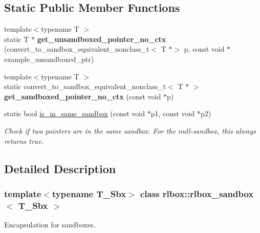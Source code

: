 \subsection*{Static Public Member Functions}
\begin{DoxyCompactItemize}
\item 
\mbox{\label{classrlbox_1_1rlbox__sandbox_a2fbafbb1cb567e11a869b0080e431d06}} 
{\footnotesize template$<$typename T $>$ }\\static T $\ast$ {\bfseries get\+\_\+unsandboxed\+\_\+pointer\+\_\+no\+\_\+ctx} (convert\+\_\+to\+\_\+sandbox\+\_\+equivalent\+\_\+nonclass\+\_\+t$<$ T $\ast$$>$ p, const void $\ast$example\+\_\+unsandboxed\+\_\+ptr)
\item 
\mbox{\label{classrlbox_1_1rlbox__sandbox_a78289528bb404a0624b9bfc3675f3c58}} 
{\footnotesize template$<$typename T $>$ }\\static convert\+\_\+to\+\_\+sandbox\+\_\+equivalent\+\_\+nonclass\+\_\+t$<$ T $\ast$ $>$ {\bfseries get\+\_\+sandboxed\+\_\+pointer\+\_\+no\+\_\+ctx} (const void $\ast$p)
\item 
\mbox{\label{classrlbox_1_1rlbox__sandbox_a3257ffc0e7eb6022c05a049b8b36271f}} 
static bool \hyperlink{classrlbox_1_1rlbox__sandbox_a3257ffc0e7eb6022c05a049b8b36271f}{is\+\_\+in\+\_\+same\+\_\+sandbox} (const void $\ast$p1, const void $\ast$p2)
\begin{DoxyCompactList}\small\item\em Check if two pointers are in the same sandbox. For the null-\/sandbox, this always returns true. \end{DoxyCompactList}\end{DoxyCompactItemize}


\subsection{Detailed Description}
\subsubsection*{template$<$typename T\+\_\+\+Sbx$>$\newline
class rlbox\+::rlbox\+\_\+sandbox$<$ T\+\_\+\+Sbx $>$}

Encapsulation for sandboxes. 


